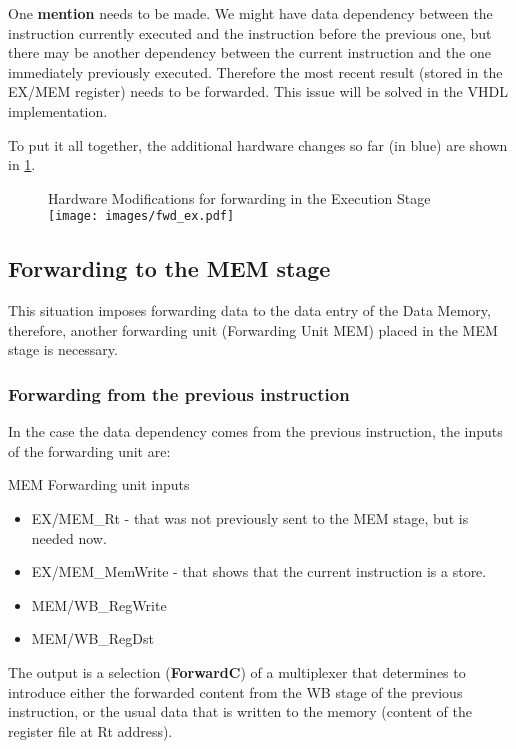 \documentclass[a4paper,12pt]{report}
\begin{document}
One \textbf{mention} needs to be made. We might have data dependency between the instruction currently executed and the instruction before the previous one, but there may be another dependency between the current instruction and the one immediately previously executed. Therefore the most recent result (stored in the EX/MEM register) needs to be forwarded. This issue will be solved in the VHDL implementation.

To put it all together, the additional hardware changes so far (in blue) are shown in \ref{fig:fwd_ex}.

\begin{figure}[h]
    \begin{my-figure}{Hardware Modifications for forwarding in the Execution Stage}
        \centering
        \texttt{[image: images/fwd\_ex.pdf]}
        \label{fig:fwd_ex}
    \end{my-figure}
\end{figure}

\subsection{Forwarding to the MEM stage}
This situation imposes forwarding data to the data entry of the Data Memory, therefore, another forwarding unit (Forwarding Unit MEM) placed in the MEM stage is necessary. 

\subsubsection{Forwarding from the previous instruction}
In the case the data dependency comes from the previous instruction, the inputs of the forwarding unit are:
\begin{my-list}{MEM Forwarding unit inputs}
    \begin{itemize}
        \item EX/MEM\_Rt - that was not previously sent to the MEM stage, but is needed now.
        \item EX/MEM\_MemWrite - that shows that the current instruction is a store.
        \item MEM/WB\_RegWrite
        \item MEM/WB\_RegDst
    \end{itemize}
\end{my-list}

The output is a selection (\textbf{ForwardC}) of a multiplexer that determines to introduce either the forwarded content from the WB stage of the previous instruction, or the usual data that is written to the memory (content of the register file at Rt address).
\end{document}
